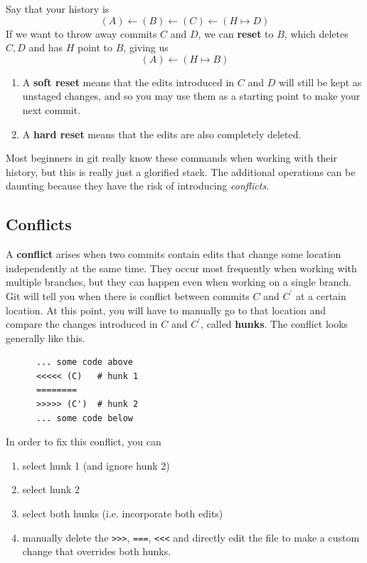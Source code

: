   \begin{definition}[Reset]
    \label{def:reset}
 
    Say that your history is 
    \begin{equation}
      (A) \leftarrow (B) \leftarrow (C) \leftarrow (H \mapsto D)
    \end{equation}  
    If we want to throw away commits $C$ and $D$, we can \textbf{reset} to $B$, which deletes $C, D$ and has $H$ point to $B$, giving us 
    \begin{equation}
      (A) \leftarrow (H \mapsto B)
    \end{equation} 
    \begin{enumerate}
      \item A \textbf{soft reset} means that the edits introduced in $C$ and $D$ will still be kept as unstaged changes, and so you may use them as a starting point to make your next commit. 
      \item A \textbf{hard reset} means that the edits are also completely deleted. 
    \end{enumerate}
  \end{definition} 

  Most beginners in git really know these commands when working with their history, but this is really just a glorified stack. The additional operations can be daunting because they have the risk of introducing \textit{conflicts}. 

\subsection{Conflicts} 

  \begin{definition}[Conflicts]
    \label{def:conflicts}
    A \textbf{conflict} arises when two commits contain edits that change some location independently at the same time. They occur most frequently when working with multiple branches, but they can happen even when working on a single branch. Git will tell you when there is conflict between commits $C$ and $C^\prime$ at a certain location. At this point, you will have to manually go to that location and compare the changes introduced in $C$ and $C^\prime$, called \textbf{hunks}. The conflict looks generally like this. 
    \begin{lstlisting}
      ... some code above 
      <<<<< (C)   # hunk 1
      ========
      >>>>> (C')  # hunk 2
      ... some code below
    \end{lstlisting} 

    In order to fix this conflict, you can  
    \begin{enumerate}
      \item select hunk 1 (and ignore hunk 2)
      \item select hunk 2 
      \item select both hunks (i.e. incorporate both edits) 
      \item manually delete the \texttt{>>>}, \texttt{===}, \texttt{<<<} and directly edit the file to make a custom change that overrides both hunks. 
    \end{enumerate} 
  \end{definition} 

